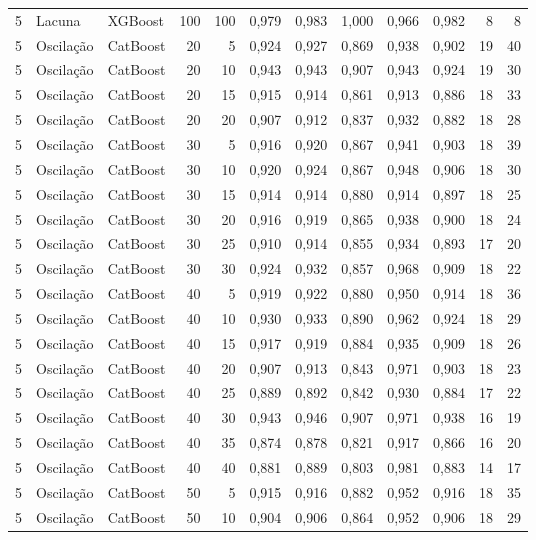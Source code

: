 \begin{longtable}{@{}rllrrrrrrrrr@{}}
5 & Lacuna & XGBoost & 100 & 100 & 0,979 & 0,983 & 1,000 & 0,966 & 0,982 & 8 & 8 \\
5 & Oscilação & CatBoost & 20 & 5 & 0,924 & 0,927 & 0,869 & 0,938 & 0,902 & 19 & 40 \\
5 & Oscilação & CatBoost & 20 & 10 & 0,943 & 0,943 & 0,907 & 0,943 & 0,924 & 19 & 30 \\
5 & Oscilação & CatBoost & 20 & 15 & 0,915 & 0,914 & 0,861 & 0,913 & 0,886 & 18 & 33 \\
5 & Oscilação & CatBoost & 20 & 20 & 0,907 & 0,912 & 0,837 & 0,932 & 0,882 & 18 & 28 \\
5 & Oscilação & CatBoost & 30 & 5 & 0,916 & 0,920 & 0,867 & 0,941 & 0,903 & 18 & 39 \\
5 & Oscilação & CatBoost & 30 & 10 & 0,920 & 0,924 & 0,867 & 0,948 & 0,906 & 18 & 30 \\
5 & Oscilação & CatBoost & 30 & 15 & 0,914 & 0,914 & 0,880 & 0,914 & 0,897 & 18 & 25 \\
5 & Oscilação & CatBoost & 30 & 20 & 0,916 & 0,919 & 0,865 & 0,938 & 0,900 & 18 & 24 \\
5 & Oscilação & CatBoost & 30 & 25 & 0,910 & 0,914 & 0,855 & 0,934 & 0,893 & 17 & 20 \\
5 & Oscilação & CatBoost & 30 & 30 & 0,924 & 0,932 & 0,857 & 0,968 & 0,909 & 18 & 22 \\
5 & Oscilação & CatBoost & 40 & 5 & 0,919 & 0,922 & 0,880 & 0,950 & 0,914 & 18 & 36 \\
5 & Oscilação & CatBoost & 40 & 10 & 0,930 & 0,933 & 0,890 & 0,962 & 0,924 & 18 & 29 \\
5 & Oscilação & CatBoost & 40 & 15 & 0,917 & 0,919 & 0,884 & 0,935 & 0,909 & 18 & 26 \\
5 & Oscilação & CatBoost & 40 & 20 & 0,907 & 0,913 & 0,843 & 0,971 & 0,903 & 18 & 23 \\
5 & Oscilação & CatBoost & 40 & 25 & 0,889 & 0,892 & 0,842 & 0,930 & 0,884 & 17 & 22 \\
5 & Oscilação & CatBoost & 40 & 30 & 0,943 & 0,946 & 0,907 & 0,971 & 0,938 & 16 & 19 \\
5 & Oscilação & CatBoost & 40 & 35 & 0,874 & 0,878 & 0,821 & 0,917 & 0,866 & 16 & 20 \\
5 & Oscilação & CatBoost & 40 & 40 & 0,881 & 0,889 & 0,803 & 0,981 & 0,883 & 14 & 17 \\
5 & Oscilação & CatBoost & 50 & 5 & 0,915 & 0,916 & 0,882 & 0,952 & 0,916 & 18 & 35 \\
5 & Oscilação & CatBoost & 50 & 10 & 0,904 & 0,906 & 0,864 & 0,952 & 0,906 & 18 & 29 \\

\end{longtable}

